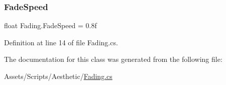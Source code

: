 \subsubsection{\texorpdfstring{Fade\+Speed}{FadeSpeed}}
{\footnotesize\ttfamily float Fading.\+Fade\+Speed = 0.\+8f}



Definition at line 14 of file Fading.\+cs.



The documentation for this class was generated from the following file\+:\begin{DoxyCompactItemize}
\item 
Assets/\+Scripts/\+Aesthetic/\mbox{\hyperlink{_fading_8cs}{Fading.\+cs}}\end{DoxyCompactItemize}
